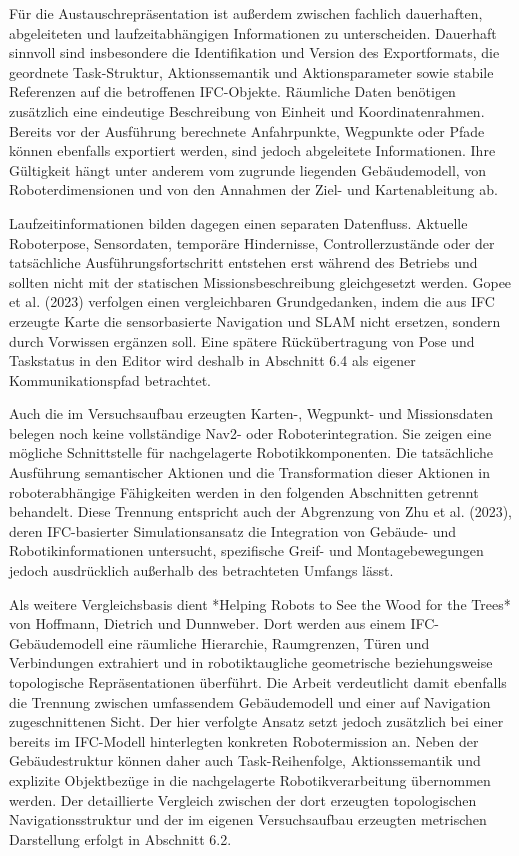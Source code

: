 Für die Austauschrepräsentation ist außerdem zwischen fachlich dauerhaften, abgeleiteten und
laufzeitabhängigen Informationen zu unterscheiden. Dauerhaft sinnvoll sind insbesondere die
Identifikation und Version des Exportformats, die geordnete Task-Struktur, Aktionssemantik und
Aktionsparameter sowie stabile Referenzen auf die betroffenen IFC-Objekte. Räumliche Daten benötigen
zusätzlich eine eindeutige Beschreibung von Einheit und Koordinatenrahmen. Bereits vor der
Ausführung berechnete Anfahrpunkte, Wegpunkte oder Pfade können ebenfalls exportiert werden, sind
jedoch abgeleitete Informationen. Ihre Gültigkeit hängt unter anderem vom zugrunde liegenden
Gebäudemodell, von Roboterdimensionen und von den Annahmen der Ziel- und Kartenableitung ab.

Laufzeitinformationen bilden dagegen einen separaten Datenfluss. Aktuelle Roboterpose, Sensordaten,
temporäre Hindernisse, Controllerzustände oder der tatsächliche Ausführungsfortschritt entstehen
erst während des Betriebs und sollten nicht mit der statischen Missionsbeschreibung gleichgesetzt
werden. Gopee et al. (2023) verfolgen einen vergleichbaren Grundgedanken, indem die aus IFC erzeugte
Karte die sensorbasierte Navigation und SLAM nicht ersetzen, sondern durch Vorwissen ergänzen soll.
Eine spätere Rückübertragung von Pose und Taskstatus in den Editor wird deshalb in Abschnitt 6.4 als
eigener Kommunikationspfad betrachtet.

Auch die im Versuchsaufbau erzeugten Karten-, Wegpunkt- und Missionsdaten belegen noch keine
vollständige Nav2- oder Roboterintegration. Sie zeigen eine mögliche Schnittstelle für nachgelagerte
Robotikkomponenten. Die tatsächliche Ausführung semantischer Aktionen und die Transformation dieser
Aktionen in roboterabhängige Fähigkeiten werden in den folgenden Abschnitten getrennt behandelt.
Diese Trennung entspricht auch der Abgrenzung von Zhu et al. (2023), deren IFC-basierter
Simulationsansatz die Integration von Gebäude- und Robotikinformationen untersucht, spezifische
Greif- und Montagebewegungen jedoch ausdrücklich außerhalb des betrachteten Umfangs lässt.

Als weitere Vergleichsbasis dient *Helping Robots to See the Wood for the Trees* von Hoffmann,
Dietrich und Dunnweber. Dort werden aus einem IFC-Gebäudemodell eine räumliche Hierarchie,
Raumgrenzen, Türen und Verbindungen extrahiert und in robotiktaugliche geometrische beziehungsweise
topologische Repräsentationen überführt. Die Arbeit verdeutlicht damit ebenfalls die Trennung
zwischen umfassendem Gebäudemodell und einer auf Navigation zugeschnittenen Sicht. Der hier
verfolgte Ansatz setzt jedoch zusätzlich bei einer bereits im IFC-Modell hinterlegten konkreten
Robotermission an. Neben der Gebäudestruktur können daher auch Task-Reihenfolge, Aktionssemantik und
explizite Objektbezüge in die nachgelagerte Robotikverarbeitung übernommen werden. Der detaillierte
Vergleich zwischen der dort erzeugten topologischen Navigationsstruktur und der im eigenen
Versuchsaufbau erzeugten metrischen Darstellung erfolgt in Abschnitt 6.2.

